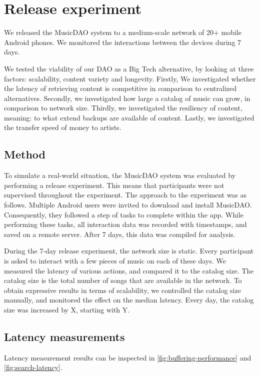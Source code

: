 \chapter{Release experiment}\label{chap:release-experiment}
We released the MusicDAO system to a medium-scale network of 20+ mobile Android phones. We monitored the interactions between the devices during 7 days. 

We tested the viability of our DAO as a Big Tech alternative, by looking at three factors: scalability, content variety and longevity. Firstly, We investigated whether the latency of retrieving content is competitive in comparison to centralized alternatives. Secondly, we investigated how large a catalog of music can grow, in comparison to network size. Thirdly, we investigated the resiliency of content, meaning: to what extend backups are available of content. Lastly, we investigated the transfer speed of money to artists.

\section{Method}
To simulate a real-world situation, the MusicDAO system was evaluated by performing a release experiment. This means that participants were not supervised throughout the experiment. The approach to the experiment was as follows. Multiple Android users were invited to download and install MusicDAO. Consequently, they followed a step of tasks to complete within the app. While performing these tasks, all interaction data was recorded with timestamps, and saved on a remote server. After 7 days, this data was compiled for analysis.

During the 7-day release experiment, the network size is static. Every participant is asked to interact with a few pieces of music on each of these days. We measured the latency of various actions, and compared it to the catalog size. The catalog size is the total number of songs that are available in the network. To obtain expressive results in terms of scalability, we controlled the catalog size manually, and monitored the effect on the median latency. Every day, the catalog size was increased by X, starting with Y.

\section{Latency measurements}
Latency measurement results can be inspected in \ref{fig:buffering-performance} and \ref{fig:search-latency}.

